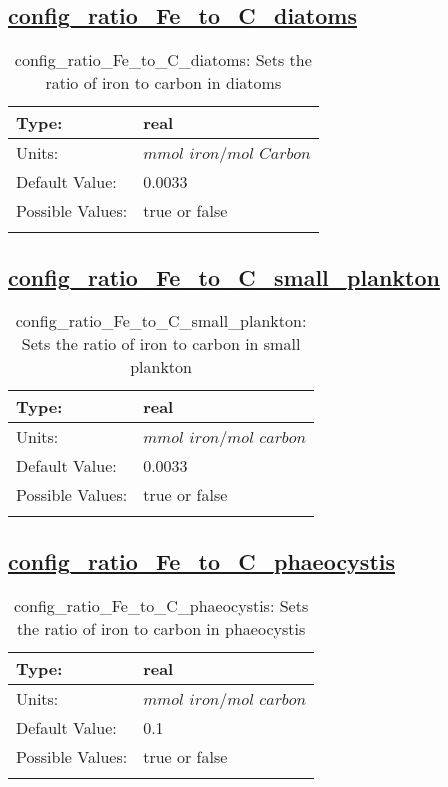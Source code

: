 \subsection[config\_ratio\_Fe\_to\_C\_diatoms]{\hyperref[sec:nm_tab_biogeochemistry]{config\_ratio\_Fe\_to\_C\_diatoms}}
\label{subsec:nm_sec_config_ratio_Fe_to_C_diatoms}
\begin{center}
\begin{longtable}{| p{2.0in} || p{4.0in} |}
    \hline
    Type: & real \\
    \hline
    Units: & $mmol$ $iron/mol$ $Carbon$ \\
    \hline
    Default Value: & 0.0033 \\
    \hline
    Possible Values: & true or false \\
    \hline
    \caption{config\_ratio\_Fe\_to\_C\_diatoms: Sets the ratio of iron to carbon in diatoms}
\end{longtable}
\end{center}
\subsection[config\_ratio\_Fe\_to\_C\_small\_plankton]{\hyperref[sec:nm_tab_biogeochemistry]{config\_ratio\_Fe\_to\_C\_small\_plankton}}
\label{subsec:nm_sec_config_ratio_Fe_to_C_small_plankton}
\begin{center}
\begin{longtable}{| p{2.0in} || p{4.0in} |}
    \hline
    Type: & real \\
    \hline
    Units: & $mmol$ $iron/mol$ $carbon$ \\
    \hline
    Default Value: & 0.0033 \\
    \hline
    Possible Values: & true or false \\
    \hline
    \caption{config\_ratio\_Fe\_to\_C\_small\_plankton: Sets the ratio of iron to carbon in small plankton}
\end{longtable}
\end{center}
\subsection[config\_ratio\_Fe\_to\_C\_phaeocystis]{\hyperref[sec:nm_tab_biogeochemistry]{config\_ratio\_Fe\_to\_C\_phaeocystis}}
\label{subsec:nm_sec_config_ratio_Fe_to_C_phaeocystis}
\begin{center}
\begin{longtable}{| p{2.0in} || p{4.0in} |}
    \hline
    Type: & real \\
    \hline
    Units: & $mmol$ $iron/mol$ $carbon$ \\
    \hline
    Default Value: & 0.1 \\
    \hline
    Possible Values: & true or false \\
    \hline
    \caption{config\_ratio\_Fe\_to\_C\_phaeocystis: Sets the ratio of iron to carbon in phaeocystis}
\end{longtable}
\end{center}
